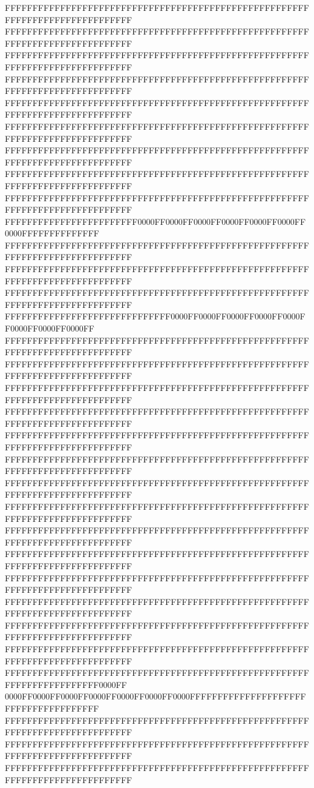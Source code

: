 FFFFFFFFFFFFFFFFFFFFFFFFFFFFFFFFFFFFFFFFFFFFFFFFFFFFFFFFFFFFFFFFFFFFFFFFFFFFFF
FFFFFFFFFFFFFFFFFFFFFFFFFFFFFFFFFFFFFFFFFFFFFFFFFFFFFFFFFFFFFFFFFFFFFFFFFFFFFF
FFFFFFFFFFFFFFFFFFFFFFFFFFFFFFFFFFFFFFFFFFFFFFFFFFFFFFFFFFFFFFFFFFFFFFFFFFFFFF
FFFFFFFFFFFFFFFFFFFFFFFFFFFFFFFFFFFFFFFFFFFFFFFFFFFFFFFFFFFFFFFFFFFFFFFFFFFFFF
FFFFFFFFFFFFFFFFFFFFFFFFFFFFFFFFFFFFFFFFFFFFFFFFFFFFFFFFFFFFFFFFFFFFFFFFFFFFFF
FFFFFFFFFFFFFFFFFFFFFFFFFFFFFFFFFFFFFFFFFFFFFFFFFFFFFFFFFFFFFFFFFFFFFFFFFFFFFF
FFFFFFFFFFFFFFFFFFFFFFFFFFFFFFFFFFFFFFFFFFFFFFFFFFFFFFFFFFFFFFFFFFFFFFFFFFFFFF
FFFFFFFFFFFFFFFFFFFFFFFFFFFFFFFFFFFFFFFFFFFFFFFFFFFFFFFFFFFFFFFFFFFFFFFFFFFFFF
FFFFFFFFFFFFFFFFFFFFFFFFFFFFFFFFFFFFFFFFFFFFFFFFFFFFFFFFFFFFFFFFFFFFFFFFFFFFFF
FFFFFFFFFFFFFFFFFFFFFFFF0000FF0000FF0000FF0000FF0000FF0000FF0000FFFFFFFFFFFFFF
FFFFFFFFFFFFFFFFFFFFFFFFFFFFFFFFFFFFFFFFFFFFFFFFFFFFFFFFFFFFFFFFFFFFFFFFFFFFFF
FFFFFFFFFFFFFFFFFFFFFFFFFFFFFFFFFFFFFFFFFFFFFFFFFFFFFFFFFFFFFFFFFFFFFFFFFFFFFF
FFFFFFFFFFFFFFFFFFFFFFFFFFFFFFFFFFFFFFFFFFFFFFFFFFFFFFFFFFFFFFFFFFFFFFFFFFFFFF
FFFFFFFFFFFFFFFFFFFFFFFFFFFFFF0000FF0000FF0000FF0000FF0000FF0000FF0000FF0000FF
FFFFFFFFFFFFFFFFFFFFFFFFFFFFFFFFFFFFFFFFFFFFFFFFFFFFFFFFFFFFFFFFFFFFFFFFFFFFFF
FFFFFFFFFFFFFFFFFFFFFFFFFFFFFFFFFFFFFFFFFFFFFFFFFFFFFFFFFFFFFFFFFFFFFFFFFFFFFF
FFFFFFFFFFFFFFFFFFFFFFFFFFFFFFFFFFFFFFFFFFFFFFFFFFFFFFFFFFFFFFFFFFFFFFFFFFFFFF
FFFFFFFFFFFFFFFFFFFFFFFFFFFFFFFFFFFFFFFFFFFFFFFFFFFFFFFFFFFFFFFFFFFFFFFFFFFFFF
FFFFFFFFFFFFFFFFFFFFFFFFFFFFFFFFFFFFFFFFFFFFFFFFFFFFFFFFFFFFFFFFFFFFFFFFFFFFFF
FFFFFFFFFFFFFFFFFFFFFFFFFFFFFFFFFFFFFFFFFFFFFFFFFFFFFFFFFFFFFFFFFFFFFFFFFFFFFF
FFFFFFFFFFFFFFFFFFFFFFFFFFFFFFFFFFFFFFFFFFFFFFFFFFFFFFFFFFFFFFFFFFFFFFFFFFFFFF
FFFFFFFFFFFFFFFFFFFFFFFFFFFFFFFFFFFFFFFFFFFFFFFFFFFFFFFFFFFFFFFFFFFFFFFFFFFFFF
FFFFFFFFFFFFFFFFFFFFFFFFFFFFFFFFFFFFFFFFFFFFFFFFFFFFFFFFFFFFFFFFFFFFFFFFFFFFFF
FFFFFFFFFFFFFFFFFFFFFFFFFFFFFFFFFFFFFFFFFFFFFFFFFFFFFFFFFFFFFFFFFFFFFFFFFFFFFF
FFFFFFFFFFFFFFFFFFFFFFFFFFFFFFFFFFFFFFFFFFFFFFFFFFFFFFFFFFFFFFFFFFFFFFFFFFFFFF
FFFFFFFFFFFFFFFFFFFFFFFFFFFFFFFFFFFFFFFFFFFFFFFFFFFFFFFFFFFFFFFFFFFFFFFFFFFFFF
FFFFFFFFFFFFFFFFFFFFFFFFFFFFFFFFFFFFFFFFFFFFFFFFFFFFFFFFFFFFFFFFFFFFFFFFFFFFFF
FFFFFFFFFFFFFFFFFFFFFFFFFFFFFFFFFFFFFFFFFFFFFFFFFFFFFFFFFFFFFFFFFFFFFFFFFFFFFF
FFFFFFFFFFFFFFFFFFFFFFFFFFFFFFFFFFFFFFFFFFFFFFFFFFFFFFFFFFFFFFFFFFFFFFFF0000FF
0000FF0000FF0000FF0000FF0000FF0000FF0000FFFFFFFFFFFFFFFFFFFFFFFFFFFFFFFFFFFFFF
FFFFFFFFFFFFFFFFFFFFFFFFFFFFFFFFFFFFFFFFFFFFFFFFFFFFFFFFFFFFFFFFFFFFFFFFFFFFFF
FFFFFFFFFFFFFFFFFFFFFFFFFFFFFFFFFFFFFFFFFFFFFFFFFFFFFFFFFFFFFFFFFFFFFFFFFFFFFF
FFFFFFFFFFFFFFFFFFFFFFFFFFFFFFFFFFFFFFFFFFFFFFFFFFFFFFFFFFFFFFFFFFFFFFFFFFFFFF
